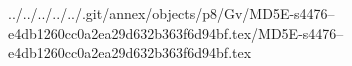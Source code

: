 ../../../../../.git/annex/objects/p8/Gv/MD5E-s4476--e4db1260cc0a2ea29d632b363f6d94bf.tex/MD5E-s4476--e4db1260cc0a2ea29d632b363f6d94bf.tex